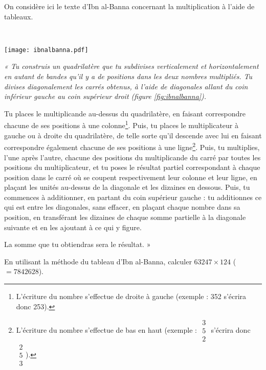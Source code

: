 \begin{td}\label{td:ibnalbanna}
On consid\`ere ici le texte d'Ibn al-Banna concernant la multiplication
\`a l'aide de tableaux.

\begin{fig}\label{fig:ibnalbanna}
\mbox{}\\
\centerline{\texttt{[image: ibnalbanna.pdf]}}
\end{fig}

{\footnotesize\em
« Tu construis un quadrilat\`ere que tu subdivises verticalement et
horizontalement en autant de bandes qu'il y a de positions dans les
deux nombres multipli\'es. Tu divises diagonalement les carr\'es
obtenus, \`a l'aide de diagonales allant du coin inf\'erieur gauche au
coin sup\'erieur droit (figure \ref{fig:ibnalbanna}).

Tu places le multiplicande au-dessus du quadrilat\`ere, en faisant 
correspondre chacune de ses positions \`a une colonne\footnote{L'écriture
du nombre s'effectue de droite à gauche (exemple : 352 s'écrira donc 253).}. 
Puis, tu places le multiplicateur \`a gauche ou \`a droite du quadrilat\`ere,
de telle sorte qu'il descende avec lui en faisant correspondre \'egalement 
chacune de ses positions \`a une ligne\footnote{L'écriture
du nombre s'effectue de bas en haut (exemple : {\tiny$\begin{array}{c}3\\5\\2\end{array}$} 
s'écrira donc {\tiny$\begin{array}{c}2\\5\\3\end{array}$}).}. Puis, tu multiplies, 
l'une apr\`es l'autre, chacune des positions du multiplicande du carr\'e 
par toutes les positions du multiplicateur, et tu poses le r\'esultat 
partiel correspondant \`a chaque position dans le carr\'e o\`u se coupent 
respectivement leur colonne et leur ligne, en pla\c{c}ant les unit\'es 
au-dessus de la diagonale et les dizaines en dessous. Puis, tu
commences \`a additionner, en partant du coin sup\'erieur gauche :
tu additionnes ce qui est entre les diagonales, sans effacer, 
en pla\c{c}ant chaque nombre dans sa position, en transf\'erant 
les dizaines de chaque somme partielle \`a la diagonale suivante et
en les ajoutant \`a ce qui y figure. 

La somme que tu obtiendras sera le r\'esultat. »}

\noindent En utilisant la m\'ethode du tableau d'Ibn al-Banna, calculer $63247\times124$ 
($= 7842628$).
\end{td}

